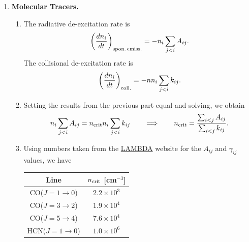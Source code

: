 \solutionset

\begin{enumerate}

\item \textbf{Molecular Tracers.}

\begin{enumerate}

\item The radiative de-excitation rate is
\begin{displaymath}
\left(\frac{dn_i}{dt}\right)_{\rm spon.\,emiss.} = -n_i \sum_{j<i} A_{ij} .
\end{displaymath}
The collisional de-excitation rate is
\begin{displaymath}
\left(\frac{dn_i}{dt}\right)_{\rm coll.} = -n n_i \sum_{j<i} k_{ij}.
\end{displaymath}

\item Setting the results from the previous part equal and solving, we obtain
\begin{displaymath}
 n_i \sum_{j<i} A_{ij} = n_{\rm crit} n_i \sum_{j<i} k_{ij} 
 \qquad \Longrightarrow \qquad
 n_{\rm crit} = \frac{\sum_{i<j} A_{ij}}{\sum_{i<j} k_{ij}}.
 \end{displaymath}
 
\item
Using numbers taken from the \href{http://www.strw.leidenuniv.nl/~moldata}{LAMBDA} website for the $A_{ij}$ and $\gamma_{ij}$ values, we have
\begin{center}
\begin{tabular}{c|c}
Line & $n_{\rm crit}$ [cm$^{-3}$] \\ \hline
CO($J=1\rightarrow 0$) & $2.2\times 10^3$ \\
CO($J=3\rightarrow 2$) & $1.9 \times 10^4$ \\
CO($J=5\rightarrow 4$) & $7.6\times 10^4$ \\
HCN($J=1\rightarrow 0$) & $1.0\times 10^6$
\end{tabular}
\end{center}


\end{enumerate}
\end{enumerate}
